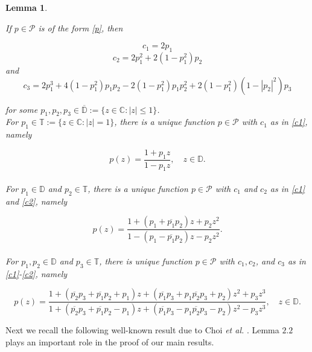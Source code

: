 \documentclass[a4paper,12pt]{amsart}
\newtheorem{lemma}[theorem]{Lemma}
\theoremstyle{definition}
\numberwithin{equation}{section}
\begin{document}
\begin{lemma}\label{caratheodary}

  If $p \in \mathcal{P}$ is of the form \eqref{p}, then


\begin{equation}\label{c1}
 c_{1}=2 p_{1}
 \end{equation}
 \begin{equation}\label{c2}
 c_{2}=2 p_{1}^{2}+2\left(1-p_{1}^{2}\right) p_{2}
 \end{equation}
and
\begin{equation}\label{c3}
c_{3}=2 p_{1}^{3}+4\left(1-p_{1}^{2}\right) p_{1} p_{2}-2\left(1-p_{1}^{2}\right) p_{1} p_{2}^{2}+2\left(1-p_{1}^{2}\right)\left(1-\left|p_{2}\right|^{2}\right) p_{3}
\end{equation}

for some $p_{1}, p_{2}, p_{3} \in \overline{\mathbb{D}}:=\{z \in \mathbb{C}:|z| \leq 1\}$.
\\[2mm]
For $p_{1} \in \mathbb{T}:=\{z \in \mathbb{C}:|z|=1\}$, there is a unique function $p \in \mathcal{P}$ with $c_{1}$ as in \eqref{c1}, namely

$$
p(z)=\frac{1+p_{1} z}{1-p_{1} z}, \quad z \in \mathbb{D} .
$$
\\[2mm]
For $p_{1} \in \mathbb{D}$ and $p_{2} \in \mathbb{T}$, there is a unique function $p \in \mathcal{P}$ with $c_{1}$ and $c_{2}$ as in \eqref{c1} and \eqref{c2}, namely

\begin{equation}\label{second}
p(z)=\frac{1+\left(p_{1}+\overline{p_{1}} p_{2}\right) z+p_{2} z^{2}}{1-\left(p_{1}-\overline{p_{1}} p_{2}\right) z-p_{2} z^{2}} .
\end{equation}
\\[2mm]
For $p_{1}, p_{2} \in \mathbb{D}$ and $p_{3} \in \mathbb{T}$, there is unique function $p \in \mathcal{P}$ with $c_{1}, c_{2}$, and $c_{3}$ as in \eqref{c1}-\eqref{c2}, namely

$$
p(z)=\frac{1+\left(\overline{p_{2}} p_{3}+\overline{p_{1}} p_{2}+p_{1}\right) z+\left(\overline{p_{1}} p_{3}+p_{1} \overline{p_{2}} p_{3}+p_{2}\right) z^{2}+p_{3} z^{3}}{1+\left(\overline{p_{2}} p_{3}+\overline{p_{1}} p_{2}-p_{1}\right) z+\left(\overline{p_{1}} p_{3}-p_{1} \overline{p_{2}} p_{3}-p_{2}\right) z^{2}-p_{3} z^{3}}, \quad z \in \mathbb{D} .
$$
\end{lemma}
Next we recall the following well-known result due to Choi {\it et al.} \cite{choi}. Lemma $2.2$ plays an important role in the proof of our main results.
\end{document}
